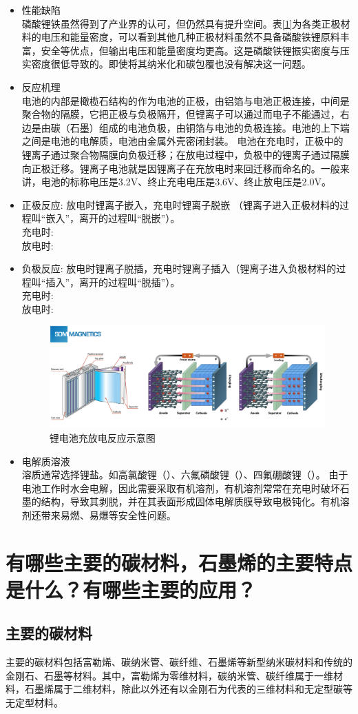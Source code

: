 \documentclass[UTF8,9pt]{ctexart}
\newcommand\se{\section}                                               %
\newcommand\sub{\subsection}                                           %
\begin{document}
\begin{itemize}
    \item 性能缺陷\\
    磷酸锂铁虽然得到了产业界的认可，但仍然具有提升空间。表\ref{1}为各类正极材料的电压和能量密度，可以看到其他几种正极材料虽然不具备磷酸铁锂原料丰富，安全等优点，但输出电压和能量密度均更高。这是磷酸铁锂振实密度与压实密度很低导致的。即使将其纳米化和碳包覆也没有解决这一问题。
    \item 反应机理\\
    电池的内部是橄榄石结构的作为电池的正极，由铝箔与电池正极连接，中间是聚合物的隔膜，它把正极与负极隔开，但锂离子可以通过而电子不能通过，右边是由碳（石墨）组成的电池负极，由铜箔与电池的负极连接。电池的上下端之间是电池的电解质，电池由金属外壳密闭封装。
    电池在充电时，正极中的锂离子通过聚合物隔膜向负极迁移；在放电过程中，负极中的锂离子通过隔膜向正极迁移。锂离子电池就是因锂离子在充放电时来回迁移而命名的。一般来讲，电池的标称电压是3.2V、终止充电电压是3.6V、终止放电压是2.0V。
    \item 正极反应: 放电时锂离子嵌入，充电时锂离子脱嵌 （锂离子进入正极材料的过程叫“嵌入”，离开的过程叫“脱嵌”）。\\
    充电时: \\
    放电时: 
    \item 负极反应: 放电时锂离子脱插，充电时锂离子插入（锂离子进入负极材料的过程叫“插入”，离开的过程叫“脱插”）。\\
    充电时: \\
    放电时: 

    \begin{figure}[htbp]
        \centering
        \includegraphics[scale=0.2]{1-45.jpg}
        \caption{锂电池充放电反应示意图}
    \end{figure}

    \item 电解质溶液\\
    溶质通常选择锂盐。如高氯酸锂（）、六氟磷酸锂（）、四氟硼酸锂（）。
    由于电池工作时水会电解，因此需要采取有机溶剂，有机溶剂常常在充电时破坏石墨的结构，导致其剥脱，并在其表面形成固体电解质膜导致电极钝化。有机溶剂还带来易燃、易爆等安全性问题。
\end{itemize}
\se{有哪些主要的碳材料，石墨烯的主要特点是什么？有哪些主要的应用？}
\sub{主要的碳材料}
主要的碳材料包括富勒烯、碳纳米管、碳纤维、石墨烯等新型纳米碳材料和传统的金刚石、石墨等材料。其中，富勒烯为零维材料，碳纳米管、碳纤维属于一维材料，石墨烯属于二维材料，除此以外还有以金刚石为代表的三维材料和无定型碳等无定型材料。
\end{document}
